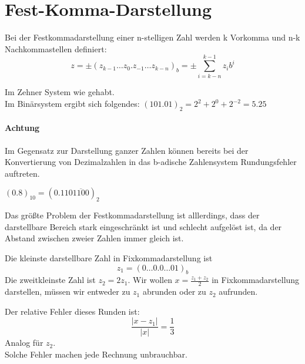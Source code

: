 \section{Fest-Komma-Darstellung}
\begin{definition}
	Bei der Festkommadarstellung einer n-stelligen Zahl werden k Vorkomma und n-k Nachkommastellen definiert:
	\[
	z=\pm (z_{k-1} \ldots z_0.z_{-1} \ldots z_{k-n})_b = \pm \sum_{i=k-n}^{k-1}z_i b^{i}
	\]

\end{definition}
\begin{example}
Im Zehner System wie gehabt.\\
Im Binärsystem ergibt sich folgendes: $(101.01)_2= 2^{2}+ 2^{0}+ 2^{-2}=5.25$
\end{example}
\paragraph{Achtung} Im Gegensatz zur Darstellung ganzer Zahlen können bereits bei der Konvertierung von Dezimalzahlen in das b-adische Zahlensystem Rundungsfehler auftreten.
\begin{example}
	$(0.8)_{10}=(0.110\overline{1100})_2$
\end{example}
Das größte Problem der Festkommadarstellung ist alllerdings, dass der darstellbare Bereich stark eingeschränkt ist und schlecht aufgelöst ist, da der Abstand zwischen zweier Zahlen immer gleich ist.
\begin{example}
Die kleinste darstellbare Zahl in Fixkommadarstellung ist \[
z_1=(0 \ldots 0.0 \ldots 0 1)_b
\]
Die zweitkleinste Zahl ist $z_2=2z_1$. Wir wollen $x=\frac{z_1+z_2}{2}$ in Fixkommadarstellung darstellen, müssen wir entweder zu $z_1$ abrunden oder zu $z_2$ aufrunden.
\end{example}
\begin{fluff}
Der relative Fehler dieses Runden ist:
\[
\frac{|x-z_1|}{|x|}=\frac{1}{3}
\]
Analog für $z_2$. \\
Solche Fehler machen jede Rechnung unbrauchbar.
\end{fluff}
